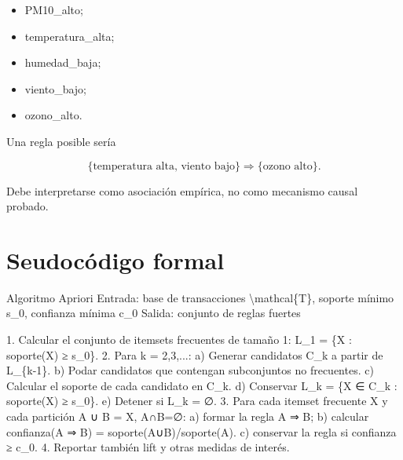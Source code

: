 \documentclass[
  spanish,
  10.5pt,
  letterpaper,
  DIV=11,
  numbers=noendperiod,
  oneside,
  open=any]{scrreprt}
\newenvironment{Shaded}{\begin{snugshade}}{\end{snugshade}}
\newcommand{\NormalTok}[1]{\textcolor[rgb]{0.00,0.23,0.31}{#1}}
\providecommand{\tightlist}{%
  \setlength{\itemsep}{0pt}\setlength{\parskip}{0pt}}
\theoremstyle{definition}
\theoremstyle{definition}
\theoremstyle{plain}
\theoremstyle{remark}
\begin{document}
\begin{itemize}
\tightlist
\item
  PM10\_alto;
\item
  temperatura\_alta;
\item
  humedad\_baja;
\item
  viento\_bajo;
\item
  ozono\_alto.
\end{itemize}

Una regla posible sería

\[
\{\text{temperatura alta, viento bajo}\}
\Rightarrow
\{\text{ozono alto}\}.
\]

Debe interpretarse como asociación empírica, no como mecanismo causal
probado.

\section*{Seudocódigo formal}\label{seudocuxf3digo-formal-11}


\begin{tcolorbox}[enhanced jigsaw, arc=.35mm, bottomrule=.15mm, bottomtitle=1mm, breakable, colback=white, colbacktitle=quarto-callout-note-color!10!white, colframe=quarto-callout-note-color-frame, coltitle=black, left=2mm, leftrule=.75mm, opacityback=0, opacitybacktitle=0.6, rightrule=.15mm, title=\textcolor{quarto-callout-note-color}{\faInfo}\hspace{0.5em}{Seudocódigo matemático formal}, titlerule=0mm, toprule=.15mm, toptitle=1mm]

\begin{Shaded}
\begin{Highlighting}[numbers=left,,]
\NormalTok{Algoritmo Apriori}
\NormalTok{Entrada:}
\NormalTok{  base de transacciones \textbackslash{}mathcal\{T\}, soporte mínimo s\_0, confianza mínima c\_0}
\NormalTok{Salida:}
\NormalTok{  conjunto de reglas fuertes}

\NormalTok{1. Calcular el conjunto de itemsets frecuentes de tamaño 1:}
\NormalTok{      L\_1 = \{X : soporte(X) ≥ s\_0\}.}
\NormalTok{2. Para k = 2,3,...:}
\NormalTok{   a) Generar candidatos C\_k a partir de L\_\{k{-}1\}.}
\NormalTok{   b) Podar candidatos que contengan subconjuntos no frecuentes.}
\NormalTok{   c) Calcular el soporte de cada candidato en C\_k.}
\NormalTok{   d) Conservar}
\NormalTok{         L\_k = \{X ∈ C\_k : soporte(X) ≥ s\_0\}.}
\NormalTok{   e) Detener si L\_k = ∅.}
\NormalTok{3. Para cada itemset frecuente X y cada partición A ∪ B = X, A∩B=∅:}
\NormalTok{   a) formar la regla A ⇒ B;}
\NormalTok{   b) calcular}
\NormalTok{         confianza(A ⇒ B) = soporte(A∪B)/soporte(A).}
\NormalTok{   c) conservar la regla si confianza ≥ c\_0.}
\NormalTok{4. Reportar también lift y otras medidas de interés.}
\end{Highlighting}
\end{Shaded}

\end{tcolorbox}
\end{document}
